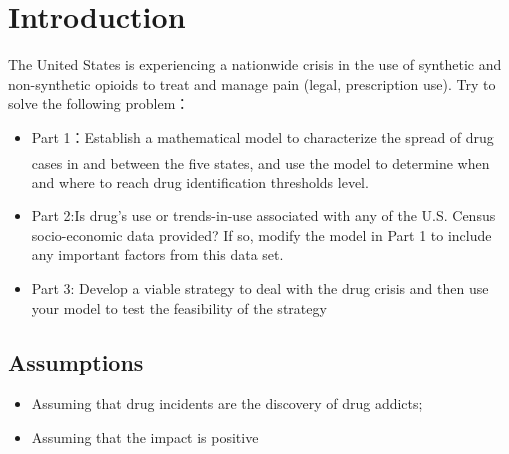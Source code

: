 \documentclass{mcmthesis}
\newcommand{\upcite}[1]{\textsuperscript{\textsuperscript{\cite{#1}}}}
\begin{document}
\tableofcontents


\section{Introduction}


The United States is experiencing a nationwide crisis in the use of synthetic and non-synthetic opioids to treat and manage pain (legal, prescription use).
Try to solve the following problem：
\begin{itemize}
  \item Part 1：Establish a mathematical model to characterize the spread of drug cases in and between the five states\upcite{svennerberg2010beginning}, and use the model to determine when and where to reach drug identification thresholds level.
  \item Part 2:Is drug’s use or trends-in-use associated with any of the U.S. Census socio-economic data provided? If so, modify the model in Part 1 to include any important factors from this data set.
  \item Part 3: Develop a viable strategy to deal with the drug crisis and then use your model to test the feasibility of the strategy
\end{itemize}



\subsection{Assumptions}
\begin{itemize}
  \item Assuming that drug incidents are the discovery of drug addicts;
  \item Assuming that the impact is positive
\end{itemize}


%
\end{document}
